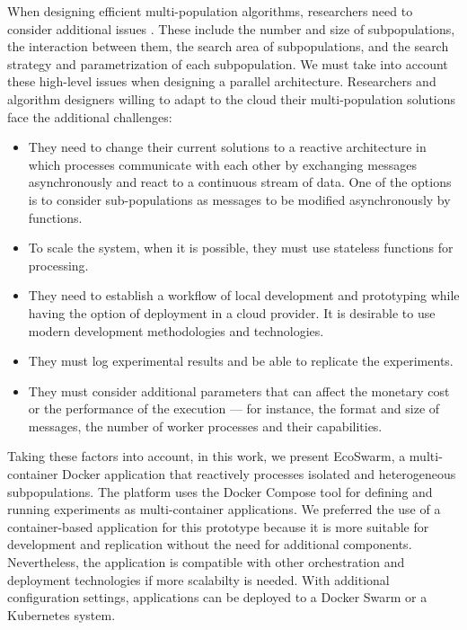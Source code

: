 \documentclass[review]{elsarticle}
\begin{document}
When designing efficient multi-population algorithms, researchers need to
consider additional issues \cite{Ma2019}. These include the number and size of subpopulations,
the interaction between them, the search area of subpopulations, and the search
strategy and parametrization of each subpopulation. We must take into account
these high-level issues when designing a parallel architecture. Researchers 
and algorithm designers willing to  adapt to the cloud their
multi-population solutions face the additional challenges:
\begin{itemize}
    \item They need to change their current solutions to a reactive architecture in which processes
    communicate with each other by exchanging messages asynchronously and react
    to a continuous stream of data. One of the options is to consider
    sub-populations as messages to be modified asynchronously by functions. 

    \item To scale the system, when it is possible, they must use stateless functions for
    processing. 

    \item They need to establish a workflow of local development and prototyping while having the 
    option of deployment in a cloud provider. It is desirable to use modern development methodologies and technologies. 

    \item They must log experimental results and be able to replicate the experiments. 

    \item They must consider additional parameters that can affect the monetary cost or the performance of the
    execution — for instance, the format and size of messages, the number of
    worker processes and their capabilities.  
\end{itemize}

Taking these factors into account, in this work, we present EcoSwarm, %
a multi-container Docker application that reactively processes isolated and
heterogeneous subpopulations. The platform uses the Docker Compose tool for
defining and running experiments as multi-container applications. 
We preferred the use of a container-based application for this prototype because
it is more suitable for development and replication without the need for
additional components. Nevertheless, the application is compatible with other
orchestration and deployment technologies if more scalabilty is needed. 
With additional configuration settings, applications can be deployed 
to a Docker Swarm or a Kubernetes system.  
\end{document}
